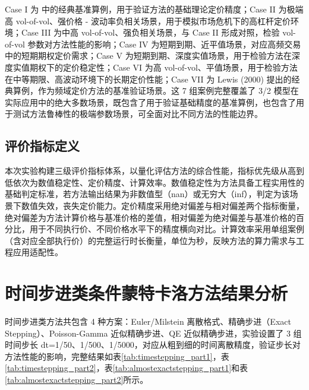 Case I 为\citet{baldeauxEXACTSIMULATION322012} 中的经典基准算例，用于验证方法的基础理论定价精度；Case II 为极端高 vol-of-vol、强价格 - 波动率负相关场景，用于模拟市场危机下的高杠杆定价环境；Case III 为中高 vol-of-vol、强负相关场景，与 Case II 形成对照，检验 vol-of-vol 参数对方法性能的影响；Case IV 为短期到期、近平值场景，对应高频交易中的短期期权定价需求；Case V 为短期到期、深度实值场景，用于检验方法在深度实值期权下的定价稳定性；Case VI 为高 vol-of-vol、平值场景，用于检验方法在中等期限、高波动环境下的长期定价性能；Case VII 为 Lewis (2000) 提出的经典算例，作为频域定价方法的基准验证场景。这 7 组案例完整覆盖了 3/2 模型在实际应用中的绝大多数场景，既包含了用于验证基础精度的基准算例，也包含了用于测试方法鲁棒性的极端参数场景，可全面对比不同方法的性能边界。
\subsection{评价指标定义}
本次实验构建三级评价指标体系，以量化评估方法的综合性能，指标优先级从高到低依次为数值稳定性、定价精度、计算效率。数值稳定性为方法具备工程实用性的基础判定标准，若方法输出结果为非数值型（nan）或无穷大（inf），判定为该场景下数值失效，丧失定价能力。定价精度采用绝对偏差与相对偏差两个指标衡量，绝对偏差为方法计算价格与基准价格的差值，相对偏差为绝对偏差与基准价格的百分比，用于不同执行价、不同价格水平下的精度横向对比。计算效率采用单组案例（含对应全部执行价）的完整运行时长衡量，单位为秒，反映方法的算力需求与工程应用适配性。

\section{时间步进类条件蒙特卡洛方法结果分析}

时间步进类方法共包含 4 种方案：Euler/Milstein 离散格式、精确步进（Exact Stepping）、Poisson-Gamma 近似精确步进、QE 近似精确步进，实验设置了 3 组时间步长 dt=1/50、1/500、1/5000，对应从粗到细的时间离散精度，验证步长对方法性能的影响，完整结果如表\ref{tab:timestepping_part1}，表\ref{tab:timestepping_part2}，表\ref{tab:almostexactstepping_part1}和表\ref{tab:almostexactstepping_part2}所示。

